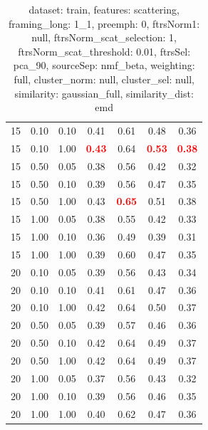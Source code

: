 \documentclass[12pt,a4paper,fleqn]{tufte-handout}
\begin{document}
\begin{table}
\begin{center}
\begin{tabular}{lllcccc}
15 & 0.10 & 0.10 & 0.41 & 0.61 & 0.48 & 0.36 \\                          
15 & 0.10 & 1.00 & \textbf{\textcolor{red}{0.43}} & 0.64 & \textbf{\textcolor{red}{0.53}} & \textbf{\textcolor{red}{0.38}} \\                          
15 & 0.50 & 0.05 & 0.38 & 0.56 & 0.42 & 0.32 \\                          
15 & 0.50 & 0.10 & 0.39 & 0.56 & 0.47 & 0.35 \\                          
15 & 0.50 & 1.00 & 0.43 & \textbf{\textcolor{red}{0.65}} & 0.51 & 0.38 \\                          
15 & 1.00 & 0.05 & 0.38 & 0.55 & 0.42 & 0.33 \\                          
15 & 1.00 & 0.10 & 0.36 & 0.49 & 0.39 & 0.31 \\                          
15 & 1.00 & 1.00 & 0.39 & 0.60 & 0.47 & 0.35 \\                          
20 & 0.10 & 0.05 & 0.39 & 0.56 & 0.43 & 0.34 \\                          
20 & 0.10 & 0.10 & 0.41 & 0.61 & 0.47 & 0.36 \\                          
20 & 0.10 & 1.00 & 0.42 & 0.64 & 0.50 & 0.37 \\                          
20 & 0.50 & 0.05 & 0.39 & 0.57 & 0.46 & 0.36 \\                          
20 & 0.50 & 0.10 & 0.42 & 0.64 & 0.49 & 0.37 \\                          
20 & 0.50 & 1.00 & 0.42 & 0.64 & 0.49 & 0.37 \\                          
20 & 1.00 & 0.05 & 0.37 & 0.56 & 0.43 & 0.32 \\                          
20 & 1.00 & 0.10 & 0.39 & 0.56 & 0.46 & 0.35 \\                          
20 & 1.00 & 1.00 & 0.40 & 0.62 & 0.47 & 0.36 \\                          
\end{tabular}                          
\end{center}                          
\caption{dataset: train, features: scattering, framing\_long: 1\_1, preemph: 0, ftrsNorm1: null, ftrsNorm\_scat\_selection: 1, ftrsNorm\_scat\_threshold: 0.01, ftrsSel: pca\_90, sourceSep: nmf\_beta, weighting: full, cluster\_norm: null, cluster\_sel: null, similarity: gaussian\_full, similarity\_dist: emd}                          
\label{datasetrFeaturscFraminlong1_1Preemp0Ftrsnorm1nuFtrsnoscatselect1Ftrsnoscatthresh0.01Ftrsselpc90SourcesepnmbeWeightfuClustenormnuClusteselnuSimilagafuSimiladistem}                          
\end{table}                          
 
\end{document}
